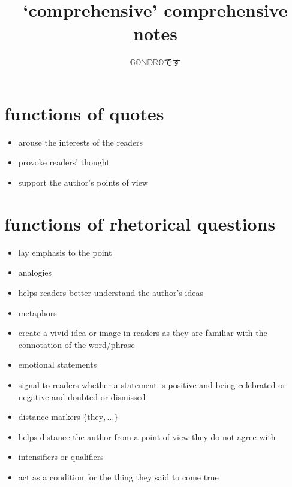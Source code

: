 \documentclass[a4paper]{article}
\title{`comprehensive' comprehensive notes}
\author{$\mathbb{GONDRO}$です}
\begin{document}
\begin{CJK}{UTF8}{min}
\maketitle

\section{functions of quotes}
\begin{itemize}
	\item arouse the interests of the readers
	\item provoke readers' thought
	\item support the author's points of view
\end{itemize}

\section{functions of rhetorical questions}
\begin{itemize}
	\item lay emphasis to the point
	\item analogies
	\item helps readers better understand the author's ideas
	\item metaphors
	\item create a vivid idea or image in readers as they are familiar with the connotation of the word/phrase
	\item emotional statements
	\item signal to readers whether a statement is positive and being celebrated or negative and doubted or dismissed
	\item distance markers \(\{\text{they},\dots\}\)
	\item helps distance the author from a point of view they do not agree with
	\item intensifiers or qualifiers
	\item act as a condition for the thing they said to come true
\end{itemize}


\end{CJK}
\end{document}
